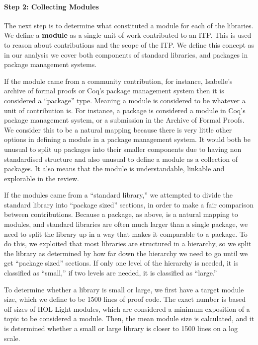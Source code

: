 \documentclass[
]{article}
\begin{document}
\hypertarget{sec:collecting_modules_meth}{%
\paragraph{Step 2: Collecting
Modules}\label{sec:collecting_modules_meth}}

The next step is to determine what constituted a module for each of the
libraries. We define a \textbf{module} as a single unit of work
contributed to an ITP. This is used to reason about contributions and
the scope of the ITP. We define this concept as in our analysis we cover
both components of standard libraries, and packages in package
management systems.

If the module came from a community contribution, for instance,
Isabelle's archive of formal proofs or Coq's package management system
then it is considered a ``package'' type. Meaning a module is considered
to be whatever a unit of contribution is. For instance, a package is
considered a module in Coq's package management system, or a submission
in the Archive of Formal Proofs. We consider this to be a natural
mapping because there is very little other options in defining a module
in a package management system. It would both be unusual to split up
packages into their smaller components due to having non standardised
structure and also unusual to define a module as a collection of
packages. It also means that the module is understandable, linkable and
explorable in the review.

If the modules came from a ``standard library,'' we attempted to divide
the standard library into ``package sized'' sections, in order to make a
fair comparison between contributions. Because a package, as above, is a
natural mapping to modules, and standard libraries are often much larger
than a single package, we need to split the library up in a way that
makes it comparable to a package. To do this, we exploited that most
libraries are structured in a hierarchy, so we split the library as
determined by how far down the hierarchy we need to go until we get
``package sized'' sections. If only one level of the hierarchy is
needed, it is classified as ``small,'' if two levels are needed, it is
classified as ``large.''

To determine whether a library is small or large, we first have a target
module size, which we define to be 1500 lines of proof code. The exact
number is based off sizes of HOL Light modules, which are considered a
minimum exposition of a topic to be considered a module. Then, the mean
module size is calculated, and it is determined whether a small or large
library is closer to 1500 lines on a log scale.
\end{document}
